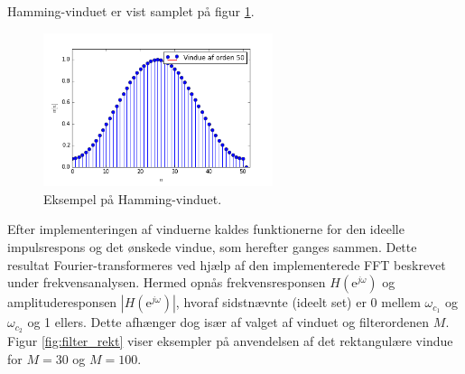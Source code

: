 Hamming-vinduet er vist samplet på figur \ref{fig:Hamming}.
\begin{figure}[H]
    \centering
    \includegraphics[width = 0.6\textwidth]{figures/Filter/Hamming-vindue.PNG}
    \caption{Eksempel på Hamming-vinduet.}
    \label{fig:Hamming}
\end{figure}

Efter implementeringen af vinduerne kaldes funktionerne for den ideelle impulsrespons og det ønskede vindue, som herefter ganges sammen. Dette resultat Fourier-transformeres ved hjælp af den implementerede FFT beskrevet under frekvensanalysen. Hermed opnås frekvensresponsen $H(\text{e}^{j\omega})$ og amplituderesponsen $|H(\text{e}^{j\omega})|$, hvoraf sidstnævnte (ideelt set) er 0 mellem $\omega_{c_1}$ og $\omega_{c_2}$ og 1 ellers. Dette afhænger dog især af valget af vinduet og filterordenen $M$. Figur \ref{fig:filter_rekt} viser eksempler på anvendelsen af det rektangulære vindue for $M = 30$ og $M = 100$.

